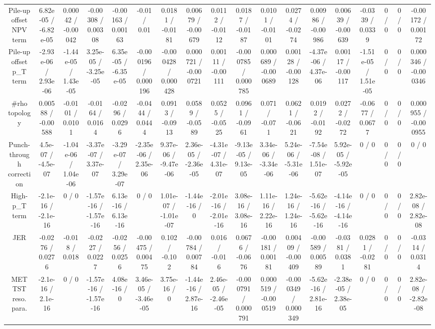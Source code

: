 \documentclass[10pt]{article}
\begin{document}
\begin{table}[htbp]
\begin{center}
\begin{tabular}{|c|c|c|c|c|c|c|c|c|c|c|c|c|c|c|c|c|c|}
  Pile-up offset NPV term & 6.82e-05 / -6.82e-05 & 0.00042 / -0.00042 & -0.00308 / 0.00308 & -0.00163 / 0.00163 & -0.01 / 0.01 & 0.0181 / -0.0181 & 0.00679 / -0.00679 & 0.0112 / -0.0112 & 0.0187 / -0.0187 & 0.0101 / -0.0101 & 0.0274 / -0.0274 & 0.00986 / -0.00986 & 0.00639 / -0.00639 & -0.0339 / 0.0339 & 0 / 0 & 0 / 0 & -0.00172 / 0.00172 \\ 
  Pile-up offset p_{T} term & -2.93e-06 / 2.93e-06 & -1.44e-05 / 1.43e-05 & 3.25e-05 / -3.25e-05 & 6.35e-05 / -6.35e-05 & -0.000196 / 0.000196 & -0.000428 / 0.000428 & 0.000721 / -0.000721 & 0.00111 / -0.00111 & -0.000785 / 0.000785 & 0.000689 / -0.000689 & 0.00128 / -0.00128 & -4.37e-06 / 4.37e-06 & 0.00117 / -0.00117 & -1.51e-05 / 1.51e-05 & 0 / 0 & 0 / 0 & 0.000346 / -0.000346 \\ 
  #rho topology & 0.00588 / -0.00588 & -0.0101 / 0.0101 & -0.0164 / 0.0164 & -0.0296 / 0.0296 & -0.0444 / 0.0444 & 0.0913 / -0.0913 & 0.0589 / -0.0589 & 0.0525 / -0.0525 & 0.0961 / -0.0961 & 0.071 / -0.071 & 0.0621 / -0.0621 & 0.0192 / -0.0192 & 0.0272 / -0.0272 & -0.0677 / 0.0677 & 0 / 0 & 0 / 0 & 0.000955 / -0.000955 \\ 
  Punch-through correction & 4.5e-07 / -4.5e-07 & -1.04e-06 / 1.04e-06 & -3.37e-07 / 3.37e-07 & -3.29e-07 / 3.29e-07 & -2.35e-06 / 2.35e-06 & 9.37e-06 / -9.47e-06 & 2.36e-05 / -2.36e-05 & -4.31e-07 / 4.31e-07 & -9.13e-05 / 9.13e-05 & 3.34e-06 / -3.34e-06 & 5.24e-06 / -5.31e-06 & -7.54e-08 / 1.51e-07 & 5.92e-05 / -5.92e-05 & 0 / 0 & 0 / 0 & 0 / 0 & 0 / 0 \\ 
  High-p_{T} term & -2.1e-16 / -2.1e-16 & 0 / 0 & -1.57e-16 / -1.57e-16 & 6.13e-16 / 6.13e-16 & 0 / 0 & 1.01e-07 / -1.01e-07 & -1.44e-16 / 0 & -2.01e-16 / -2.01e-16 & 3.08e-16 / 3.08e-16 & 1.11e-16 / 2.22e-16 & 1.24e-16 / 1.24e-16 & -5.62e-16 / -5.62e-16 & -4.14e-16 / -4.14e-16 & 0 / 0 & 0 / 0 & 0 / 0 & 2.82e-08 / 2.82e-08 \\ 
  JER & -0.0276 / 0.0276 & -0.018 / 0.018 & -0.0227 / 0.0227 & -0.0256 / 0.0256 & -0.00475 / 0.00475 & 0.102 / -0.102 & -0.00784 / 0.00784 & 0.016 / -0.016 & 0.0676 / -0.0676 & -0.00181 / 0.00181 & 0.00409 / -0.00409 & -0.00589 / 0.00589 & -0.0381 / 0.0381 & 0.0281 / -0.0281 & 0 / 0 & 0 / 0 & -0.0314 / 0.0314 \\ 
  MET TST reso. para. & -2.1e-16 / 2.1e-16 & 0 / 0 & -1.57e-16 / -1.57e-16 & 4.08e-16 / 0 & 3.46e-05 / -3.46e-05 & 3.75e-16 / 0 & -1.44e-16 / 2.87e-16 & 2.46e-05 / -2.46e-05 & -0.000791 / 0.000791 & 0.000519 / -0.000519 & -0.000349 / 0.000349 & -5.62e-16 / 2.81e-16 & -2.38e-05 / 2.38e-05 & 0 / 0 & 0 / 0 & 0 / 0 & 2.82e-08 / -2.82e-08 \\ 

\end{tabular}
\end{center}
\end{table}
\end{document}

